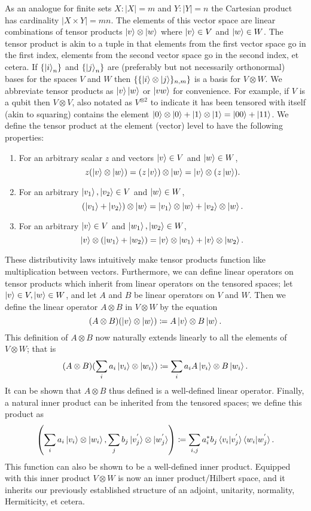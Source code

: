 \documentclass[12pt,twoside]{reedthesis}
\theoremstyle{plain}   %
\theoremstyle{definition}
\theoremstyle{remark}
\numberwithin{equation}{section}
\begin{document}
  As an analogue for finite sets $X: |X| = m$ and $Y: |Y| = n$ the Cartesian product has cardinality $|X \times Y| = mn$.
  The elements of this vector space are linear combinations of tensor products $\ket{v} \otimes \ket{w}$
  where $\ket{v} \in V$ and $\ket{w} \in W$.
  The tensor product is akin to a tuple in that elements from the first vector space go in the first index, elements from the second vector space go in the second index, et cetera.
  If $\{\ket{i}_n \}$ and $\{\ket{j}_n \}$ are (preferably but not necessarily orthonormal) bases for the spaces $V$ and $W$ then $\{\{ \ket{i} \otimes \ket{j} \}_{n, m}\}$ is a basis for $V \otimes W$.
  We abbreviate tensor products as $\ket{v} \ket{w}$ or $\ket{vw}$ for convenience.
  For example, if $V$ is a qubit then $V \otimes V$, also notated as $V^{\otimes 2}$ to indicate it has been tensored with itself (akin to squaring) contains the element
  $\ket{0} \otimes \ket{0} + \ket{1} \otimes \ket{1} = \ket{0 0} + \ket{1 1}$.
  We define the tensor product at the element (vector) level to have the following properties:
  \begin{enumerate}
  \item For an arbitrary scalar $z$ and vectors $\ket{v} \in V$ and $\ket{w} \in W$,
    \[ z ( \ket{v} \otimes \ket{w}) = (z \ket{v}) \otimes \ket{w} = \ket{v} \otimes (z \ket{w }).\]

  \item
    For an arbitrary $\ket{v_1}, \ket{v_2} \in V$ and $\ket{w} \in W$,
    \[ (\ket{v_1} + \ket{v_2}) \otimes \ket{w} = \ket{v_1}  \otimes \ket{w} + \ket{v_2} \otimes \ket{w}. \]
  \item
    For an arbitrary $\ket{v} \in V$ and $\ket{w_1}, \ket{w_2} \in W$,
    \[ \ket{v} \otimes (\ket{w_1} + \ket{w_2})  = \ket{v}  \otimes \ket{w_1} + \ket{v} \otimes \ket{w_2}. \]
  \end{enumerate}
  These distributivity laws intuitively make tensor products function like multiplication between vectors.
  Furthermore, we can define linear operators on tensor products which inherit from linear operators on the tensored spaces;
  let $\ket{v} \in V, \ket{w} \in W$, and let $A$ and $B$ be linear operators on $V$ and $W$.
  Then we define the linear operator $A \otimes B$ in $V \otimes W$ by the equation
  \[(A \otimes B) (\ket{v} \otimes \ket{w}) \coloneq A  \ket{v} \otimes B \ket{w}.\]
  This definition of $A \otimes B$ now naturally extends linearly to all the elements of $V \otimes W$; that is
  \[(A \otimes B) (\sum_i a_i \ket{v_i} \otimes \ket{w_i}) \coloneq \sum_i a_i A\ket{v_i} \otimes B\ket{w_i}.\]
  It can be shown that $A \otimes B$ thus defined is a well-defined linear operator.
  Finally, a natural inner product can be inherited from the tensored spaces; we define this product as 
  \[ \left( \sum_i a_i \ket{v_i} \otimes \ket{w_i}, \sum_j b_j \ket{v^{'}_j} \otimes \ket{w^{'}_j}  \right) \coloneq
    \sum_{i, j} a_i^* b_j \braket{v_i  | v^{'}_j} \braket{w_i  | w^{'}_j}. \]
  This function can also be shown to be a well-defined inner product. Equipped with this inner product $V \otimes W$ is now an inner product/Hilbert space, and it inherits our previously established structure of
  an adjoint, unitarity, normality, Hermiticity, et cetera.
\end{document}
